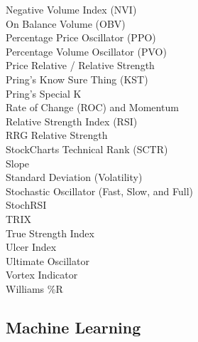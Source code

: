 \documentclass[12pt,a4paper]{article}
\begin{document}
Negative Volume Index (NVI) \\

On Balance Volume (OBV) \\

Percentage Price Oscillator (PPO) \\

Percentage Volume Oscillator (PVO) \\

Price Relative / Relative Strength \\

Pring's Know Sure Thing (KST) \\

Pring's Special K \\

Rate of Change (ROC) and Momentum \\

Relative Strength Index (RSI) \\

RRG Relative Strength \\

StockCharts Technical Rank (SCTR) \\

Slope \\

Standard Deviation (Volatility) \\

Stochastic Oscillator (Fast, Slow, and Full) \\

StochRSI \\

TRIX \\

True Strength Index \\

Ulcer Index \\

Ultimate Oscillator \\

Vortex Indicator \\

Williams \%R \\

\iffalse
#################################################################################
\fi

\subsection*{Machine Learning}
\end{document}
